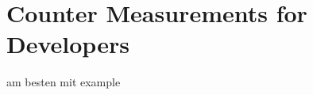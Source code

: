 \chapter{Counter Measurements for Developers}\label{chapter:countermeasurements}

am besten mit example





